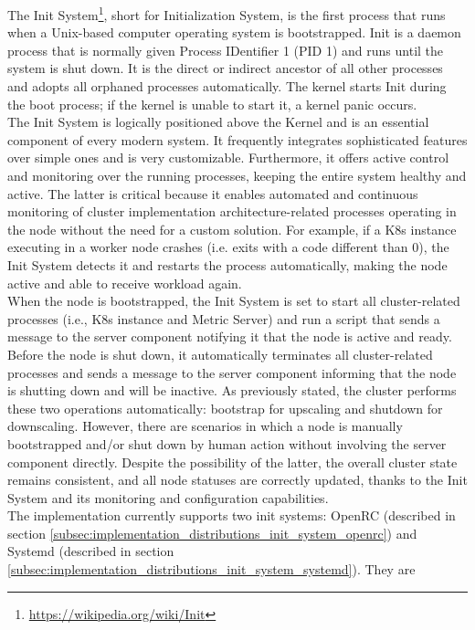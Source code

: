 The Init System\footnote{\url{https://wikipedia.org/wiki/Init}}, short for Initialization
System, is the first process that runs when a Unix-based computer operating
system is bootstrapped. Init is a daemon process that is normally given Process IDentifier
1 (PID 1) and runs until the system is shut down. It is the direct or indirect
ancestor of all other processes and adopts all orphaned processes automatically.
The kernel starts Init during the boot process; if the kernel is unable to start
it, a kernel panic occurs. \\ %
The Init System is logically positioned above the Kernel and is an essential component
of every modern system. It frequently integrates sophisticated features over
simple ones and is very customizable. Furthermore, it offers active control and
monitoring over the running processes, keeping the entire system healthy and active.
The latter is critical because it enables automated and continuous monitoring of
cluster implementation architecture-related processes operating in the node
without the need for a custom solution. For example, if a K8s instance executing
in a worker node crashes (i.e. exits with a code different than 0), the Init
System detects it and restarts the process automatically, making the node active
and able to receive workload again. \\ %
When the node is bootstrapped, the Init System is set to start all cluster-related
processes (i.e., K8s instance and Metric Server) and run a script that sends a
message to the server component notifying it that the node is active and ready. Before
the node is shut down, it automatically terminates all cluster-related processes
and sends a message to the server component informing that the node is shutting
down and will be inactive. As previously stated, the cluster performs these two
operations automatically: bootstrap for upscaling and shutdown for downscaling.
However, there are scenarios in which a node is manually bootstrapped and/or shut
down by human action without involving the server component directly. Despite
the possibility of the latter, the overall cluster state remains consistent, and
all node statuses are correctly updated, thanks to the Init System and its monitoring
and configuration capabilities. \\ %
The implementation currently supports two init systems: OpenRC (described in section
\ref{subsec:implementation_distributions_init_system_openrc}) and Systemd (described
in section \ref{subsec:implementation_distributions_init_system_systemd}). They are
